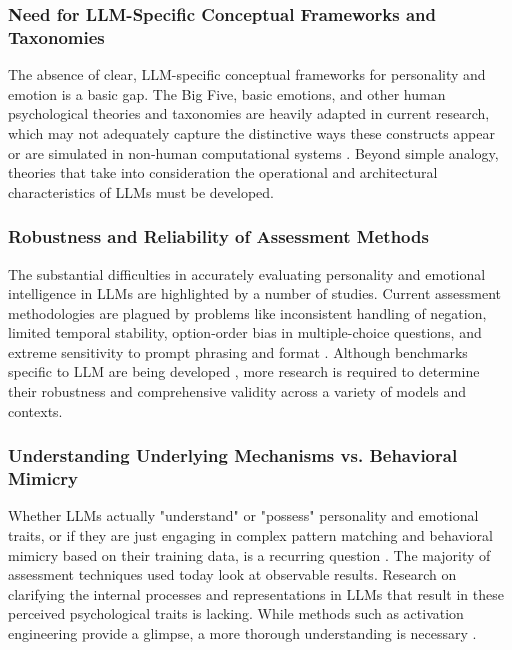 \documentclass{DESSThesis}
\begin{document}
\subsubsection{Need for LLM-Specific Conceptual Frameworks and Taxonomies}
The absence of clear, LLM-specific conceptual frameworks for personality and emotion is a basic gap. The Big Five, basic emotions, and other human psychological theories and taxonomies are heavily adapted in current research, which may not adequately capture the distinctive ways these constructs appear or are simulated in non-human computational systems \cite{suhr_challenging_2023,gupta_self-assessment_2024,chang_modeling_2024,sabour_emobench_2024}. Beyond simple analogy, theories that take into consideration the operational and architectural characteristics of LLMs must be developed.

\subsubsection{Robustness and Reliability of Assessment Methods}
The substantial difficulties in accurately evaluating personality and emotional intelligence in LLMs are highlighted by a number of studies. Current assessment methodologies are plagued by problems like inconsistent handling of negation, limited temporal stability, option-order bias in multiple-choice questions, and extreme sensitivity to prompt phrasing and format \cite{gupta_self-assessment_2024,shu_you_2024,suhr_challenging_2023,tommaso_llms_2024}. Although benchmarks specific to LLM are being developed \cite{jiang_evaluating_2023,lee_llms_2024,paech_eq-bench_2024,sabour_emobench_2024,zhao_both_2024}, more research is required to determine their robustness and comprehensive validity across a variety of models and contexts.

\subsubsection{Understanding Underlying Mechanisms vs. Behavioral Mimicry}
Whether LLMs actually "understand" or "possess" personality and emotional traits, or if they are just engaging in complex pattern matching and behavioral mimicry based on their training data, is a recurring question \cite{chang_modeling_2024,sabour_emobench_2024,wang_emotional_2023}. The majority of assessment techniques used today look at observable results. Research on clarifying the internal processes and representations in LLMs that result in these perceived psychological traits is lacking. While methods such as activation engineering provide a glimpse, a more thorough understanding is necessary \cite{allbert_identifying_2025}.
\end{document}
